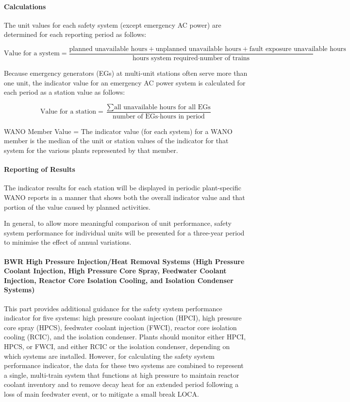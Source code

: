\paragraph{Calculations}

The unit values for each safety system (except emergency AC power) are
determined for each reporting period as follows:

$$ \text{Value for a system} =
\frac{\text{planned unavailable hours}+\text{unplanned unavailable hours}+\text{fault
exposure unavailable hours}}{\text{hours system required} \cdot \text{number of
trains}} $$

Because emergency generators (EGs) at multi-unit stations often serve
more than one unit, the indicator value for an emergency AC power
system is calculated for each period as a station value as follows:

$$ \text{Value for a station} = \frac{\sum{\text{all unavailable hours for all
EGs}}}{\text{number of EGs} \cdot \text{hours in period}} $$

WANO Member Value = The indicator value (for each system) for a WANO
member is the median of the unit or station values of the indicator
for that system for the various plants represented by that member.

\paragraph{Reporting of Results}

The indicator results for each station will be displayed in periodic
plant-specific WANO reports in a manner that shows both the overall
indicator value and that portion of the value caused by planned
activities.

In general, to allow more meaningful comparison of unit performance,
safety system performance for individual units will be presented for a
three-year period to minimise the effect of annual variations.

\paragraph{BWR High Pressure Injection/Heat Removal Systems (High
  Pressure Coolant Injection, High Pressure Core Spray, Feedwater
  Coolant Injection, Reactor Core Isolation Cooling, and Isolation
  Condenser Systems)}

This part provides additional guidance for the safety system
performance indicator for five systems: high pressure coolant
injection (HPCI), high pressure core spray (HPCS), feedwater coolant
injection (FWCI), reactor core isolation cooling (RCIC), and the
isolation condenser. Plants should monitor either HPCI, HPCS, or FWCI,
and either RCIC or the isolation condenser, depending on which systems
are installed. However, for calculating the safety system performance
indicator, the data for these two systems are combined to represent a
single, multi-train system that functions at high pressure to maintain
reactor coolant inventory and to remove decay heat for an extended
period following a loss of main feedwater event, or to mitigate a
small break LOCA.

